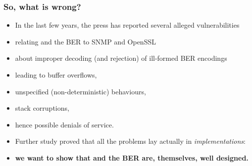 \documentclass[compress,dvips,xcolor={dvipsnames},t]{beamer}
\begin{document}
%
\begin{frame}
\frametitle{So, what is wrong?}

\begin{itemize}

  \item In the last few years, the press has reported several alleged
  vulnerabilities

  \item relating \ASN and the BER to SNMP and OpenSSL

  \item about improper decoding (and rejection) of ill-formed BER
  encodings

  \item leading to buffer overflows,

  \item unspecified (non-deterministic) behaviours,

  \item stack corruptions,

  \item hence possible denials of service.

  \item Further study proved that all the problems lay actually in
  \emph{implementations}:

  \item \textbf{we want to show that \ASN and the BER are, themselves,
  well designed.}

\end{itemize}

\end{frame}
\end{document}
